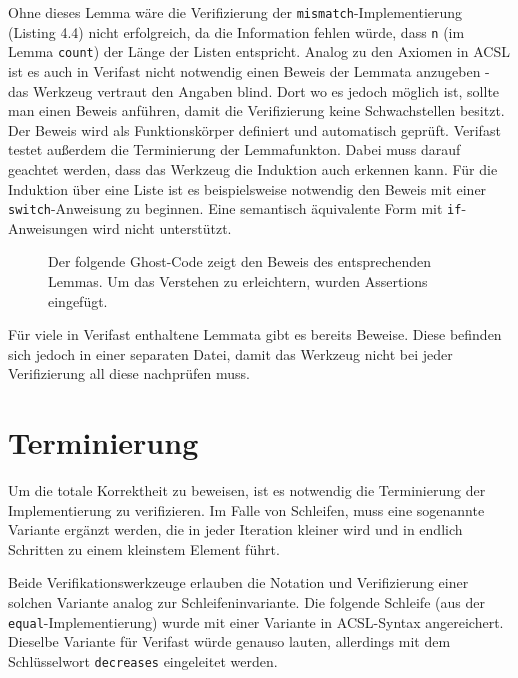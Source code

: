 Ohne dieses Lemma wäre die Verifizierung der \lstinline{mismatch}-Implementierung (Listing 4.4)
nicht erfolgreich, da die Information fehlen würde, dass \lstinline{n} (im Lemma \lstinline{count})
der Länge der Listen entspricht.
\newline
\newline
Analog zu den Axiomen in ACSL ist es auch in Verifast nicht notwendig einen Beweis der Lemmata anzugeben -
das Werkzeug vertraut den Angaben blind. Dort wo es jedoch möglich ist, sollte man einen Beweis anführen,
damit die Verifizierung keine Schwachstellen besitzt.
Der Beweis wird als Funktionskörper definiert und automatisch geprüft. Verifast testet außerdem die
Terminierung der Lemmafunkton. 
Dabei muss  darauf geachtet werden, dass das Werkzeug die Induktion auch 
erkennen kann. Für die Induktion über eine Liste ist es beispielsweise notwendig den Beweis mit einer 
\texttt{switch}-Anweisung zu beginnen. Eine semantisch äquivalente Form mit \texttt{if}-Anweisungen wird 
nicht unterstützt.
\begin{figure}[H]
Der folgende Ghost-Code zeigt den Beweis des entsprechenden Lemmas. Um das Verstehen zu erleichtern,
wurden Assertions eingefügt.

\end{figure} 
Für viele in Verifast enthaltene Lemmata gibt es bereits Beweise. Diese befinden sich jedoch in einer separaten
Datei, damit das Werkzeug nicht bei jeder Verifizierung all diese nachprüfen muss.

\section{Terminierung}

Um die totale Korrektheit zu beweisen, ist es notwendig die Terminierung der Implementierung zu
verifizieren. Im Falle von Schleifen, muss eine sogenannte Variante ergänzt werden, die
in jeder Iteration kleiner wird und in endlich Schritten zu einem kleinstem Element führt.

Beide Verifikationswerkzeuge erlauben die Notation und Verifizierung einer solchen Variante analog zur
Schleifeninvariante. Die folgende Schleife (aus der \texttt{equal}-Implementierung) wurde mit einer Variante 
in ACSL-Syntax angereichert. Dieselbe Variante für Verifast würde genauso lauten, allerdings
mit dem Schlüsselwort \texttt{decreases} eingeleitet werden.
\begin{figure}[H]

\end{figure}

